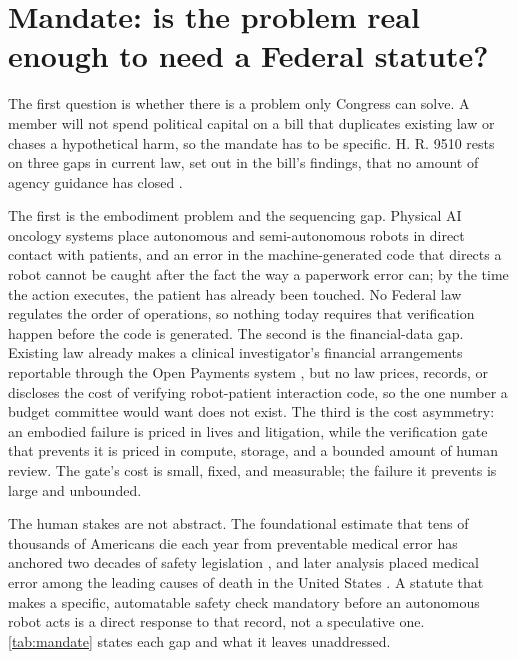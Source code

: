 \section{Mandate: is the problem real enough to need a Federal statute?}
\label{sec:mandate}

The first question is whether there is a problem only Congress can solve. A member
will not spend political capital on a bill that duplicates existing law or chases a
hypothetical harm, so the mandate has to be specific. H. R. 9510 rests on three gaps
in current law, set out in the bill's findings, that no amount of agency guidance has
closed \cite{Kawchak2026HR9510Bill}.

The first is the embodiment problem and the sequencing gap. Physical AI oncology
systems place autonomous and semi-autonomous robots in direct contact with patients,
and an error in the machine-generated code that directs a robot cannot be caught
after the fact the way a paperwork error can; by the time the action executes, the
patient has already been touched. No Federal law regulates the order of operations,
so nothing today requires that verification happen before the code is generated. The
second is the financial-data gap. Existing law already makes a clinical
investigator's financial arrangements reportable through the Open Payments system
\cite{openpayments}, but no law prices, records, or discloses the cost of verifying
robot-patient interaction code, so the one number a budget committee would want does
not exist. The third is the cost asymmetry: an embodied failure is priced in lives
and litigation, while the verification gate that prevents it is priced in compute,
storage, and a bounded amount of human review. The gate's cost is small, fixed, and
measurable; the failure it prevents is large and unbounded.

The human stakes are not abstract. The foundational estimate that tens of thousands
of Americans die each year from preventable medical error has anchored two decades
of safety legislation \cite{kohn2000toerr}, and later analysis placed medical error
among the leading causes of death in the United States \cite{makary2016medical}. A
statute that makes a specific, automatable safety check mandatory before an
autonomous robot acts is a direct response to that record, not a speculative one.
\autoref{tab:mandate} states each gap and what it leaves unaddressed.

